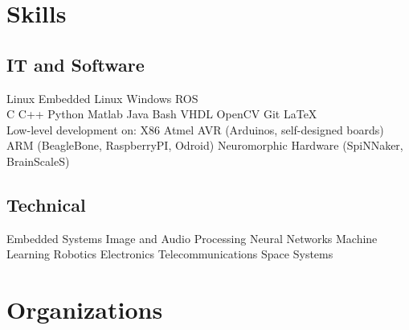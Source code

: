 \documentclass[a4paper]{deedy-resume} %
\begin{document}
\begin{minipage}[b]{0.42\linewidth}
			
	
	\section{Skills}
	\vspace{5pt}
	\subsection{IT and Software}
	\vspace{2pt}
	Linux \textbullet{} Embedded Linux \textbullet{} Windows \textbullet{} ROS\\
	\vspace{3pt}
	C \textbullet{} C++ \textbullet{} Python \textbullet{} Matlab \textbullet{} Java \textbullet{} Bash \textbullet{} VHDL \textbullet{} OpenCV \textbullet{} Git \textbullet{} \LaTeX\\
	\vspace{3pt}
	Low-level development on: X86 \textbullet{} Atmel AVR (Arduinos, self-designed boards) \textbullet{} ARM (BeagleBone, RaspberryPI, Odroid) \textbullet{} Neuromorphic Hardware (SpiNNaker, BrainScaleS)
	\vspace{5pt}
	
	\subsection{Technical}
	Embedded Systems \textbullet{}
	Image and Audio Processing \textbullet{} Neural Networks \textbullet{} Machine Learning \textbullet{} Robotics \textbullet{} Electronics \textbullet{} Telecommunications \textbullet{} Space Systems
	\vspace{5pt}
\end{minipage}

\vspace{10pt}



\section{Organizations}
\vspace{5pt}
\end{document}
